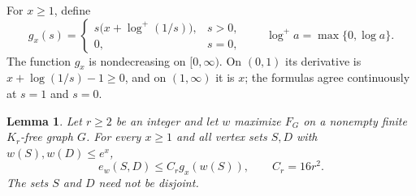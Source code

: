 \documentclass[11pt]{article}
\newtheorem{lemma}[theorem]{Lemma}
\theoremstyle{definition}
\theoremstyle{remark}
\numberwithin{equation}{section}
\begin{document}
For $x\ge1$, define
\[
 g_x(s)=
 \begin{cases}
 s\bigl(x+\log^+(1/s)\bigr),&s>0,\\
 0,&s=0,
 \end{cases}
 \qquad \log^+ a=\max\{0,\log a\}.
\]
The function $g_x$ is nondecreasing on $[0,\infty)$.  On $(0,1)$ its
derivative is $x+\log(1/s)-1\ge0$, and on $(1,\infty)$ it is $x$;
the formulas agree continuously at $s=1$ and $s=0$.

\begin{lemma}\label{lem:cross-mass}
Let $r\ge2$ be an integer and let $w$ maximize $F_G$ on a nonempty finite $K_r$-free
graph $G$.  For every $x\ge1$ and all vertex sets $S,D$ with
$w(S),w(D)\le e^x$,
\begin{equation}\label{eq:optimizer-cross-mass}
 e_w(S,D)\le C_r g_x(w(S)),
 \qquad C_r=16r^2.
\end{equation}
The sets $S$ and $D$ need not be disjoint.
\end{lemma}
\end{document}
